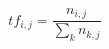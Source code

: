\documentclass{article}
\begin{document}
    $$ tf_{i,j} = \frac{n_{i,j}}{\sum_k n_{k,j}} $$
\end{document}
